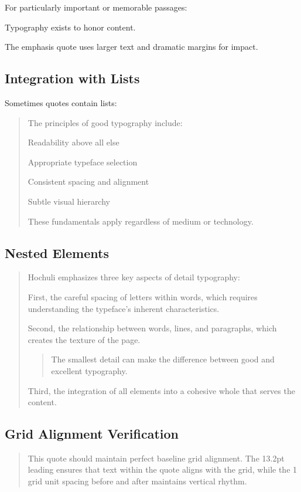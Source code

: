 \documentclass[11pt,a4paper]{article}
\begin{document}
For particularly important or memorable passages:
\begin{emphasisquote}
Typography exists to honor content.
\end{emphasisquote}

The emphasis quote uses larger text and dramatic margins for impact.

\subsection{Integration with Lists}

Sometimes quotes contain lists:
\begin{quote}
The principles of good typography include:
\begin{compactitem}
\item Readability above all else
\item Appropriate typeface selection
\item Consistent spacing and alignment
\item Subtle visual hierarchy
\end{compactitem}
These fundamentals apply regardless of medium or technology.
\end{quote}

\subsection{Nested Elements}

\begin{quotation}
Hochuli emphasizes three key aspects of detail typography:

First, the careful spacing of letters within words, which requires understanding the typeface's inherent characteristics.

Second, the relationship between words, lines, and paragraphs, which creates the texture of the page.

\begin{quote}
The smallest detail can make the difference between good and excellent typography.
\end{quote}

Third, the integration of all elements into a cohesive whole that serves the content.
\end{quotation}

\subsection{Grid Alignment Verification}

\lipsum[1][1-3]

\begin{quote}
This quote should maintain perfect baseline grid alignment. The 13.2pt leading ensures that text within the quote aligns with the grid, while the 1 grid unit spacing before and after maintains vertical rhythm.
\end{quote}

\lipsum[2][1-3]
\end{document}

